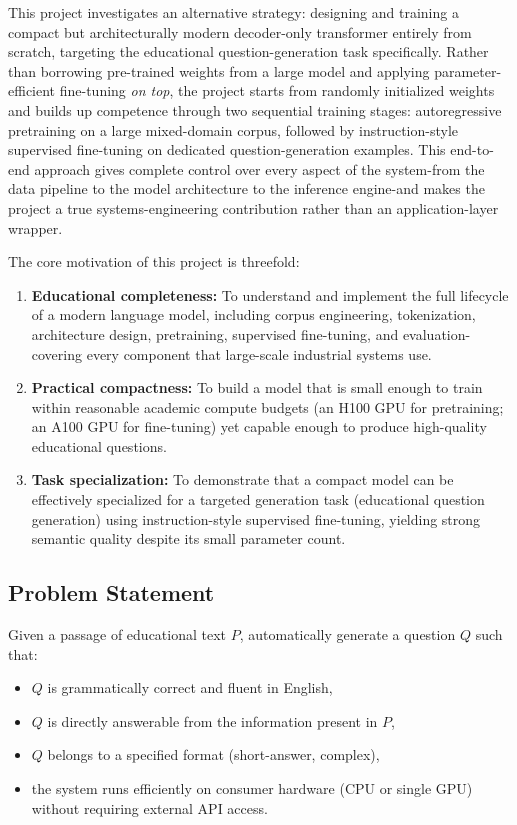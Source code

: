 \documentclass[12pt]{article}
\begin{document}
This project investigates an alternative strategy: designing and training a compact but architecturally modern decoder-only transformer entirely from scratch, targeting the educational question-generation task specifically. Rather than borrowing pre-trained weights from a large model and applying parameter-efficient fine-tuning \textit{on top}, the project starts from randomly initialized weights and builds up competence through two sequential training stages: autoregressive pretraining on a large mixed-domain corpus, followed by instruction-style supervised fine-tuning on dedicated question-generation examples. This end-to-end approach gives complete control over every aspect of the system-from the data pipeline to the model architecture to the inference engine-and makes the project a true systems-engineering contribution rather than an application-layer wrapper.

The core motivation of this project is threefold:
\begin{enumerate}[leftmargin=1.2cm]
  \item \textbf{Educational completeness:} To understand and implement the full lifecycle of a modern language model, including corpus engineering, tokenization, architecture design, pretraining, supervised fine-tuning, and evaluation-covering every component that large-scale industrial systems use.
  \item \textbf{Practical compactness:} To build a model that is small enough to train within reasonable academic compute budgets (an H100 GPU for pretraining; an A100 GPU for fine-tuning) yet capable enough to produce high-quality educational questions.
  \item \textbf{Task specialization:} To demonstrate that a compact model can be effectively specialized for a targeted generation task (educational question generation) using instruction-style supervised fine-tuning, yielding strong semantic quality despite its small parameter count.
\end{enumerate}

\subsection{Problem Statement}
\label{sec:problem}

Given a passage of educational text $P$, automatically generate a question $Q$ such that:
\begin{itemize}[leftmargin=1.2cm]
  \item $Q$ is grammatically correct and fluent in English,
  \item $Q$ is directly answerable from the information present in $P$,
  \item $Q$ belongs to a specified format (short-answer, complex),
  \item the system runs efficiently on consumer hardware (CPU or single GPU) without requiring external API access.
\end{itemize}
\end{document}
